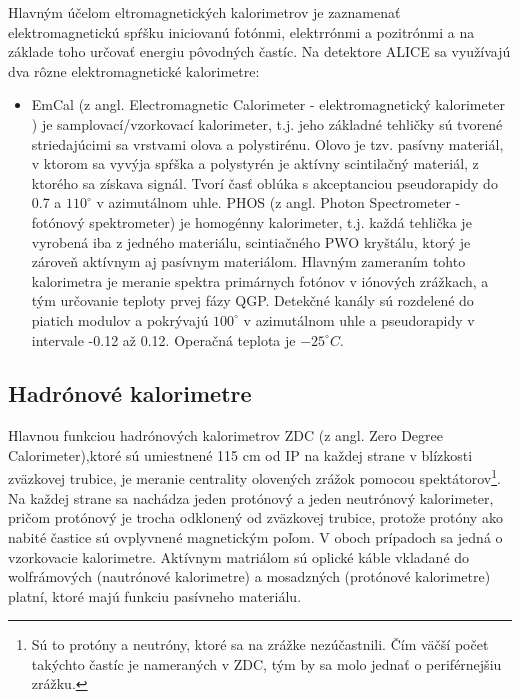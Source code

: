 \documentclass[thesismargins, thesislinespacing]{rnthesis}
\begin{document}
Hlavným účelom eltromagnetických kalorimetrov je zaznamenať elektromagnetickú spŕšku iniciovanú fotónmi, elektrrónmi a pozitrónmi a na základe toho určovať energiu pôvodných častíc. Na detektore ALICE sa využívajú dva rôzne elektromagnetické kalorimetre:
\begin{itemize}
	\item EmCal (z angl. Electromagnetic Calorimeter - elektromagnetický kalorimeter ) je samplovací/vzorkovací kalorimeter, t.j. jeho základné tehličky sú tvorené striedajúcimi sa vrstvami olova a polystirénu. Olovo je tzv. pasívny materiál, v ktorom sa vyvýja spŕška a polystyrén je aktívny scintilačný materiál, z ktorého sa získava signál. Tvorí časť oblúka s akceptanciou pseudorapidy do 0.7 a $110^\circ$ v azimutálnom uhle.   
	PHOS (z angl. Photon Spectrometer - fotónový spektrometer) je homogénny kalorimeter, t.j. každá tehlička je vyrobená iba z jedného materiálu, scintiačného PWO kryštálu, ktorý je zároveň aktívnym aj pasívnym materiálom. Hlavným zameraním tohto kalorimetra je meranie spektra primárnych fotónov v iónových zrážkach, a tým určovanie teploty prvej fázy QGP. Detekčné kanály sú rozdelené do piatich modulov a pokrývajú $100^\circ$ v azimutálnom uhle a pseudorapidy v intervale -0.12 až 0.12. Operačná teplota je $-25^\circ C$.
\end{itemize}

\subsection{Hadrónové kalorimetre}
Hlavnou funkciou hadrónových kalorimetrov ZDC (z angl. Zero Degree Calorimeter),ktoré sú umiestnené 115 cm od IP na každej strane v blízkosti zväzkovej trubice, je meranie centrality olovených zrážok pomocou spektátorov\footnote{Sú to protóny a neutróny, ktoré sa na zrážke nezúčastnili. Čím väčší počet takýchto častíc je nameraných v ZDC, tým by sa molo jednať o periférnejšiu zrážku.}. Na každej strane sa nachádza jeden protónový a jeden neutrónový kalorimeter, pričom protónový je trocha odklonený od zväzkovej trubice, protože protóny ako nabité častice sú ovplyvnené magnetickým poľom. V oboch prípadoch sa jedná o vzorkovacie kalorimetre. Aktívnym matriálom sú oplické káble vkladané do wolfrámových (nautrónové kalorimetre) a mosadzných (protónové kalorimetre) platní, ktoré majú funkciu pasívneho materiálu. 
\end{document}
